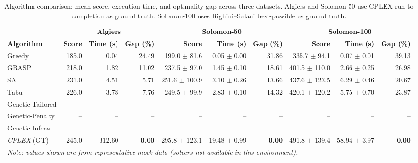 \begin{table}[htbp]
\centering
\caption{Algorithm comparison: mean score, execution time, and optimality gap across three datasets. Algiers and Solomon-50 use CPLEX run to completion as ground truth. Solomon-100 uses Righini--Salani best-possible as ground truth.}
\label{tab:algo_comparison}
\small
\setlength{\tabcolsep}{4pt}
\begin{tabular}{l rrr rrr rrr}
\toprule
& \multicolumn{3}{c}{\textbf{Algiers}}
& \multicolumn{3}{c}{\textbf{Solomon-50}}
& \multicolumn{3}{c}{\textbf{Solomon-100}} \\
\cmidrule(lr){2-4} \cmidrule(lr){5-7} \cmidrule(lr){8-10}
\textbf{Algorithm}
& \textbf{Score} & \textbf{Time (s)} & \textbf{Gap (\%)}
& \textbf{Score} & \textbf{Time (s)} & \textbf{Gap (\%)}
& \textbf{Score} & \textbf{Time (s)} & \textbf{Gap (\%)} \\
\midrule
Greedy & 185.0 & 0.04 & 24.49 & 199.0 $\pm$ 81.6 & 0.05 $\pm$ 0.00 & 31.86 & 335.7 $\pm$ 94.1 & 0.07 $\pm$ 0.01 & 39.13 \\
GRASP & 218.0 & 1.82 & 11.02 & 237.5 $\pm$ 97.0 & 1.45 $\pm$ 0.10 & 18.61 & 401.5 $\pm$ 110.0 & 2.66 $\pm$ 0.25 & 26.98 \\
SA & 231.0 & 4.51 & 5.71 & 251.6 $\pm$ 100.9 & 3.10 $\pm$ 0.26 & 13.66 & 437.6 $\pm$ 123.5 & 6.29 $\pm$ 0.46 & 20.67 \\
Tabu & 226.0 & 3.78 & 7.76 & 249.5 $\pm$ 99.9 & 2.83 $\pm$ 0.10 & 14.32 & 420.1 $\pm$ 120.2 & 5.75 $\pm$ 0.70 & 23.87 \\
Genetic-Tailored & -- & -- & -- & -- & -- & -- & -- & -- & -- \\
Genetic-Penalty & -- & -- & -- & -- & -- & -- & -- & -- & -- \\
Genetic-Infeas & -- & -- & -- & -- & -- & -- & -- & -- & -- \\
\textit{CPLEX} (GT) & 245.0 & 312.60 & \textbf{0.00} & 295.8 $\pm$ 123.1 & 19.48 $\pm$ 0.99 & \textbf{0.00} & 491.8 $\pm$ 139.4 & 58.94 $\pm$ 3.97 & \textbf{0.00} \\
\bottomrule
\multicolumn{10}{l}{\textit{Note: values shown are from representative mock data (solvers not available in this environment).}} \\
\end{tabular}
\end{table}